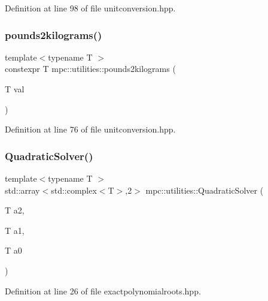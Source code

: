 Definition at line 98 of file unitconversion.\+hpp.

\mbox{\label{namespacempc_1_1utilities_a2c2a93627483d29fb5ecaa11be521680}} 
\subsubsection{\texorpdfstring{pounds2kilograms()}{pounds2kilograms()}}
{\footnotesize\ttfamily template$<$typename T $>$ \\
constexpr T mpc\+::utilities\+::pounds2kilograms (\begin{DoxyParamCaption}\item[{T}]{val }\end{DoxyParamCaption})}



Definition at line 76 of file unitconversion.\+hpp.

\mbox{\label{namespacempc_1_1utilities_ad175f8823052a6c863ffb2e90e2b08ca}} 
\subsubsection{\texorpdfstring{Quadratic\+Solver()}{QuadraticSolver()}}
{\footnotesize\ttfamily template$<$typename T $>$ \\
std\+::array$<$std\+::complex$<$T$>$,2$>$ mpc\+::utilities\+::\+Quadratic\+Solver (\begin{DoxyParamCaption}\item[{T}]{a2,  }\item[{T}]{a1,  }\item[{T}]{a0 }\end{DoxyParamCaption})}



Definition at line 26 of file exactpolynomialroots.\+hpp.

\mbox{\label{namespacempc_1_1utilities_a86772b476b0e0aa1567f42c8a9aa7a3c}} 
